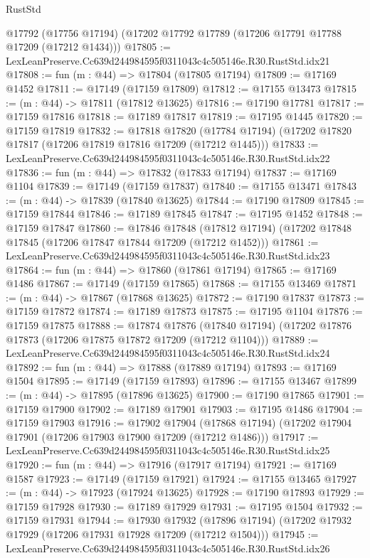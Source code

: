 \begin{lexlean}{RustStd}
\begin{coremodule}
    @17792
    (@17756 @17194)
    (@17202 @17792 @17789 (@17206 @17791 @17788 @17209 (@17212 @1434)))
@17805 := LexLeanPreserve.Cc639d244984595f0311043c4c505146e.R30.RustStd.idx21
@17808 := fun (m : @44) => @17804 (@17805 @17194)
@17809 := @17169 @1452
@17811 := @17149 (@17159 @17809)
@17812 := @17155 @13473
@17815 := (m : @44) -> @17811 (@17812 @13625)
@17816 := @17190 @17781
@17817 := @17159 @17816
@17818 := @17189 @17817
@17819 := @17195 @1445
@17820 := @17159 @17819
@17832 := @17818
    @17820
    (@17784 @17194)
    (@17202 @17820 @17817 (@17206 @17819 @17816 @17209 (@17212 @1445)))
@17833 := LexLeanPreserve.Cc639d244984595f0311043c4c505146e.R30.RustStd.idx22
@17836 := fun (m : @44) => @17832 (@17833 @17194)
@17837 := @17169 @1104
@17839 := @17149 (@17159 @17837)
@17840 := @17155 @13471
@17843 := (m : @44) -> @17839 (@17840 @13625)
@17844 := @17190 @17809
@17845 := @17159 @17844
@17846 := @17189 @17845
@17847 := @17195 @1452
@17848 := @17159 @17847
@17860 := @17846
    @17848
    (@17812 @17194)
    (@17202 @17848 @17845 (@17206 @17847 @17844 @17209 (@17212 @1452)))
@17861 := LexLeanPreserve.Cc639d244984595f0311043c4c505146e.R30.RustStd.idx23
@17864 := fun (m : @44) => @17860 (@17861 @17194)
@17865 := @17169 @1486
@17867 := @17149 (@17159 @17865)
@17868 := @17155 @13469
@17871 := (m : @44) -> @17867 (@17868 @13625)
@17872 := @17190 @17837
@17873 := @17159 @17872
@17874 := @17189 @17873
@17875 := @17195 @1104
@17876 := @17159 @17875
@17888 := @17874
    @17876
    (@17840 @17194)
    (@17202 @17876 @17873 (@17206 @17875 @17872 @17209 (@17212 @1104)))
@17889 := LexLeanPreserve.Cc639d244984595f0311043c4c505146e.R30.RustStd.idx24
@17892 := fun (m : @44) => @17888 (@17889 @17194)
@17893 := @17169 @1504
@17895 := @17149 (@17159 @17893)
@17896 := @17155 @13467
@17899 := (m : @44) -> @17895 (@17896 @13625)
@17900 := @17190 @17865
@17901 := @17159 @17900
@17902 := @17189 @17901
@17903 := @17195 @1486
@17904 := @17159 @17903
@17916 := @17902
    @17904
    (@17868 @17194)
    (@17202 @17904 @17901 (@17206 @17903 @17900 @17209 (@17212 @1486)))
@17917 := LexLeanPreserve.Cc639d244984595f0311043c4c505146e.R30.RustStd.idx25
@17920 := fun (m : @44) => @17916 (@17917 @17194)
@17921 := @17169 @1587
@17923 := @17149 (@17159 @17921)
@17924 := @17155 @13465
@17927 := (m : @44) -> @17923 (@17924 @13625)
@17928 := @17190 @17893
@17929 := @17159 @17928
@17930 := @17189 @17929
@17931 := @17195 @1504
@17932 := @17159 @17931
@17944 := @17930
    @17932
    (@17896 @17194)
    (@17202 @17932 @17929 (@17206 @17931 @17928 @17209 (@17212 @1504)))
@17945 := LexLeanPreserve.Cc639d244984595f0311043c4c505146e.R30.RustStd.idx26

\end{coremodule}
\end{lexlean}
